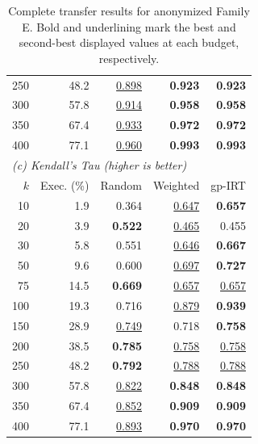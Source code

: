 \begin{table}[t]
\begin{tabular}{rrrrr}
    250 & 48.2 & \underline{0.898} & \textbf{0.923} & \textbf{0.923} \\
    300 & 57.8 & \underline{0.914} & \textbf{0.958} & \textbf{0.958} \\
    350 & 67.4 & \underline{0.933} & \textbf{0.972} & \textbf{0.972} \\
    400 & 77.1 & \underline{0.960} & \textbf{0.993} & \textbf{0.993} \\
    \midrule
    \multicolumn{5}{l}{\textit{(c) Kendall's Tau (higher is better)}} \\
    $k$ & Exec. (\%) & Random & Weighted & gp-IRT \\
    \midrule
    10 & 1.9 & 0.364 & \underline{0.647} & \textbf{0.657} \\
    20 & 3.9 & \textbf{0.522} & \underline{0.465} & 0.455 \\
    30 & 5.8 & 0.551 & \underline{0.646} & \textbf{0.667} \\
    50 & 9.6 & 0.600 & \underline{0.697} & \textbf{0.727} \\
    75 & 14.5 & \textbf{0.669} & \underline{0.657} & \underline{0.657} \\
    100 & 19.3 & 0.716 & \underline{0.879} & \textbf{0.939} \\
    150 & 28.9 & \underline{0.749} & 0.718 & \textbf{0.758} \\
    200 & 38.5 & \textbf{0.785} & \underline{0.758} & \underline{0.758} \\
    250 & 48.2 & \textbf{0.792} & \underline{0.788} & \underline{0.788} \\
    300 & 57.8 & \underline{0.822} & \textbf{0.848} & \textbf{0.848} \\
    350 & 67.4 & \underline{0.852} & \textbf{0.909} & \textbf{0.909} \\
    400 & 77.1 & \underline{0.893} & \textbf{0.970} & \textbf{0.970} \\
    \bottomrule
  \end{tabular}
  \caption{Complete transfer results for anonymized Family E. Bold and underlining mark the best and second-best displayed values at each budget, respectively.}
  \label{tab:transfer-family-e-complete}
\end{table}
